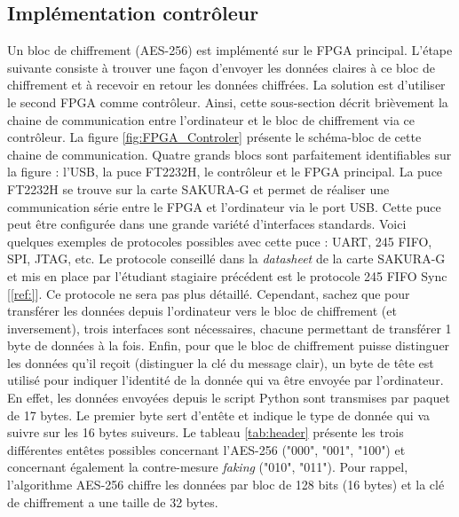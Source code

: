 \documentclass[oneside]{book}
\begin{document}
\subsection{Implémentation contrôleur}
\label{sec:Imp_contrôleur}

Un bloc de chiffrement (AES-256) est implémenté sur le FPGA principal. L'étape suivante consiste à trouver une façon d'envoyer les données claires à ce bloc de chiffrement et à recevoir en retour les données chiffrées. La solution est d'utiliser le second FPGA comme contrôleur. Ainsi, cette sous-section décrit brièvement la chaine de communication entre l'ordinateur et le bloc de chiffrement via ce contrôleur. La figure \ref{fig:FPGA_Controler} présente le schéma-bloc de cette chaine de communication. Quatre grands blocs sont parfaitement identifiables sur la figure : l'USB, la puce FT2232H, le contrôleur et le FPGA principal. La puce FT2232H se trouve sur la carte SAKURA-G et permet de réaliser une communication série entre le FPGA et l'ordinateur via le port USB. Cette puce peut être configurée dans une grande variété d'interfaces standards. Voici quelques exemples de protocoles possibles avec cette puce : UART, 245 FIFO, SPI, JTAG, etc. Le protocole conseillé dans la \textit{datasheet} de la carte SAKURA-G et mis en place par l'étudiant stagiaire précédent est le protocole 245 FIFO Sync [\ref{ref:}]. Ce protocole ne sera pas plus détaillé. Cependant, sachez que pour transférer les données depuis l'ordinateur vers le bloc de chiffrement (et inversement), trois interfaces sont nécessaires, chacune permettant de transférer 1 byte de données à la fois. Enfin, pour que le bloc de chiffrement puisse distinguer les données qu'il reçoit (distinguer la clé du message clair), un byte de tête est utilisé pour indiquer l'identité de la donnée qui va être envoyée par l'ordinateur. En effet, les données envoyées depuis le script Python sont transmises par paquet de 17 bytes. Le premier byte sert d'entête et indique le type de donnée qui va suivre sur les 16 bytes suiveurs. Le tableau \ref{tab:header} présente les trois différentes entêtes possibles concernant l'AES-256 ("000", "001", "100") et concernant également la contre-mesure \textit{faking} ("010", "011"). Pour rappel, l'algorithme AES-256 chiffre les données par bloc de 128 bits (16 bytes) et la clé de chiffrement a une taille de 32 bytes.
\vspace{0.5cm}
\end{document}
